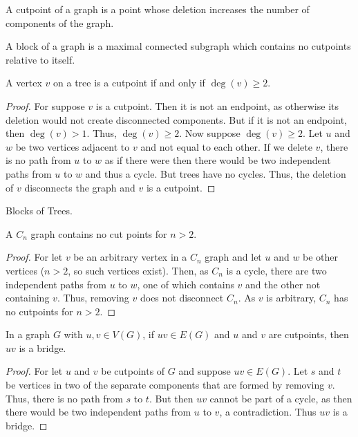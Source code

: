 \documentclass[crop=false,class=book,oneside]{standalone}
\begin{document}
        \begin{definition}
        A cutpoint of a graph is a point whose deletion increases the number of components of the graph.
        \end{definition}
        \begin{definition}
        A block of a graph is a maximal connected subgraph which contains no cutpoints relative to itself.
        \end{definition}
        \begin{theorem}
        A vertex $v$ on a tree is a cutpoint if and only if $\deg(v) \geq 2$.
        \end{theorem}
        \begin{proof}
        For suppose $v$ is a cutpoint. Then it is not an endpoint, as otherwise its deletion would not create disconnected components. But if it is not an endpoint, then $\deg(v)>1$. Thus, $\deg(v)\geq 2$. Now suppose $\deg(v) \geq 2$. Let $u$ and $w$ be two vertices adjacent to $v$ and not equal to each other. If we delete $v$, there is no path from $u$ to $w$ as if there were then there would be two independent paths from $u$ to $w$ and thus a cycle. But trees have no cycles. Thus, the deletion of $v$ disconnects the graph and $v$ is a cutpoint.
        \end{proof}
        \begin{theorem}
        Blocks of Trees.
        \end{theorem}
        \begin{corollary}
        A $C_n$ graph contains no cut points for $n>2$.
        \end{corollary}
        \begin{proof}
        For let $v$ be an arbitrary vertex in a $C_n$ graph and let $u$ and $w$ be other vertices ($n>2$, so such vertices exist). Then, as $C_n$ is a cycle, there are two independent paths from $u$ to $w$, one of which contains $v$ and the other not containing $v$. Thus, removing $v$ does not disconnect $C_n$. As $v$ is arbitrary, $C_n$ has no cutpoints for $n>2$.
        \end{proof}
        \begin{theorem}
        In a graph $G$ with $u,v\in V(G)$, if $uv\in E(G)$ and $u$ and $v$ are cutpoints, then $uv$ is a bridge.
        \end{theorem}
        \begin{proof}
        For let $u$ and $v$ be cutpoints of $G$ and suppose $uv\in E(G)$. Let $s$ and $t$ be vertices in two of the separate components that are formed by removing $v$. Thus, there is no path from $s$ to $t$. But then $uv$ cannot be part of a cycle, as then there would be two independent paths from $u$ to $v$, a contradiction. Thus $uv$ is a bridge.
        \end{proof}
\end{document}
